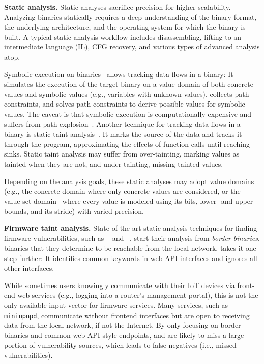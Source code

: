 \smallskip
\noindent
\textbf{Static analysis.}
Static analyses sacrifice precision for higher scalability.
Analyzing binaries statically requires a deep understanding of the binary format, the underlying architecture, and the operating system for which the binary is built.
A typical static analysis workflow includes disassembling, lifting to an intermediate language (IL), CFG recovery, and various types of advanced analysis atop.

Symbolic execution on binaries~\cite{king1976symbolic,wang2017angr} allows tracking data flows in a binary:
It simulates the execution of the target binary on a value domain of both concrete values and symbolic values (e.g., variables with unknown values), collects path constraints, and solves path constraints to derive possible values for symbolic values.
The caveat is that symbolic execution is computationally expensive and suffers from path explosion~\cite{krishnamoorthy2010tackling}.
Another technique for tracking data flows in a binary is static taint analysis~\cite{saxena2008efficient}.
It marks the source of the data and tracks it through the program, approximating the effects of function calls until reaching sinks.
Static taint analysis may suffer from over-tainting, marking values as tainted when they are not, and under-tainting, missing tainted values.

Depending on the analysis goals, these static analyses may adopt value domains (e.g., the concrete domain where only concrete values are considered, or the value-set domain~\cite{balakrishnan2005codesurfer} where every value is modeled using its bits, lower- and upper-bounds, and its stride) with varied precision.

\smallskip
\noindent
\textbf{Firmware taint analysis.}
State-of-the-art static analysis techniques for finding firmware vulnerabilities, such as \karonte~\cite{karonte} and \satc~\cite{SaTC}, start their analysis from \emph{border binaries}, binaries that they determine to be reachable from the local network.
\satc takes it one step further:
It identifies common keywords in web API interfaces and ignores all other interfaces.

While sometimes users knowingly communicate with their IoT devices via front-end web services (e.g., logging into a router's management portal), this is not the only available input vector for firmware services.
Many services, such as \texttt{miniupnpd}, communicate without frontend interfaces but are open to receiving data from the local network, if not the Internet.
By only focusing on border binaries and common web-API-style endpoints, \karonte and \satc are likely to miss a large portion of vulnerability sources, which leads to false negatives (i.e., missed vulnerabilities).

